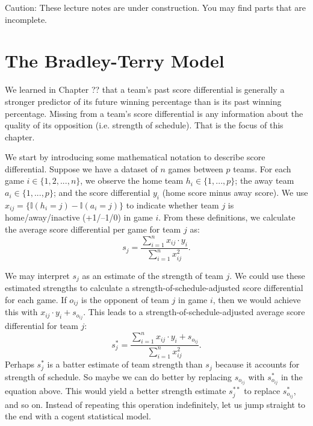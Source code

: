 \documentclass{article}
\begin{document}
\begin{framed}
  {\sc Caution:} These lecture notes are under construction. You may find parts that are incomplete.
\end{framed}

\setcounter{section}{2}
\section{\sc The Bradley-Terry Model}

  We learned in Chapter ?? that a team's past score differential is generally a stronger predictor of its future winning percentage than is its past winning percentage. Missing from a team's score differential is any information about the quality of its opposition (i.e. strength of schedule). That is the focus of this chapter.

  We start by introducing some mathematical notation to describe score differential. Suppose we have a dataset of $n$ games between $p$ teams. For each game $i \in \{1, 2, ..., n\}$, we observe the home team $h_i \in \{1, ..., p\}$; the away team $a_i \in \{1, ..., p\}$; and the score differential $y_i$ (home score minus away score). We use $x_{ij} = \{\mathbb{I}(h_i = j) - \mathbb{I}(a_i = j)\}$ to indicate whether team $j$ is home/away/inactive (+1/--1/0) in game $i$. From these definitions, we calculate the average score differential per game for team $j$ as:
  \begin{equation*}
    s_j = \frac{
      \sum_{i=1}^n x_{ij} \cdot y_i
    }{
      \sum_{i=1}^n x_{ij}^2
    }.
  \end{equation*}

  We may interpret $s_j$ as an estimate of the strength of team $j$. We could use these estimated strengths to calculate a strength-of-schedule-adjusted score differential for each game. If $o_{ij}$ is the opponent of team $j$ in game $i$, then we would achieve this with $x_{ij} \cdot y_i + s_{o_{ij}}$. This leads to a strength-of-schedule-adjusted average score differential for team $j$:
  \begin{equation}
    \label{eqn-adjusted-point-differential}
    s^*_j = \frac{
      \sum_{i=1}^n x_{ij} \cdot y_i + s_{o_{ij}}
    }{
      \sum_{i=1}^n x_{ij}^2
    }.
  \end{equation}
  Perhaps $s^*_j$ is a batter estimate of team strength than $s_j$ because it accounts for strength of schedule. So maybe we can do better by replacing $s_{o_{ij}}$ with $s^*_{o_{ij}}$ in the equation above. This would yield a better strength estimate $s^{**}_j$ to replace $s^*_{o_{ij}}$, and so on. Instead of repeating this operation indefinitely, let us jump straight to the end with a cogent statistical model.
\end{document}
